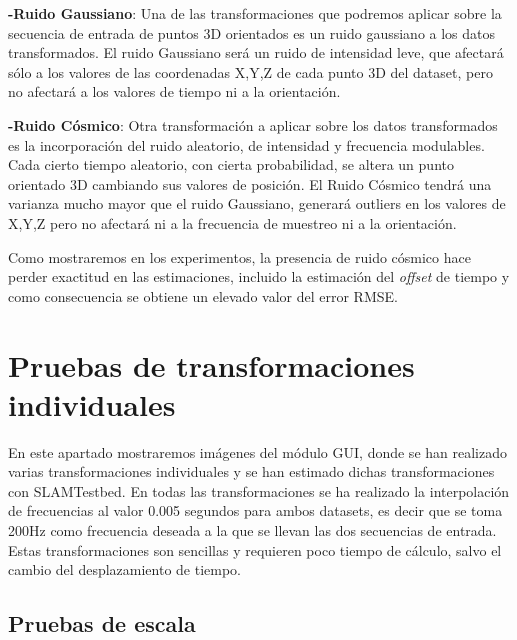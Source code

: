 \textbf{-Ruido Gaussiano}: Una de las transformaciones que podremos aplicar sobre la secuencia de entrada de puntos 3D orientados es un ruido gaussiano a los datos transformados. El ruido Gaussiano será un ruido de intensidad leve, que afectará sólo a los valores de las coordenadas X,Y,Z de cada punto 3D del dataset, pero no afectará a los valores de tiempo ni a la orientación.

\textbf{-Ruido Cósmico}: Otra transformación a aplicar sobre los datos transformados es la incorporación del ruido aleatorio, de intensidad y frecuencia modulables. Cada cierto tiempo aleatorio, con cierta probabilidad, se altera un punto orientado 3D cambiando sus valores de posición. El Ruido Cósmico tendrá una varianza mucho mayor que el ruido Gaussiano, generará outliers en los valores de X,Y,Z pero no afectará ni a la frecuencia de muestreo ni a la orientación. 

Como mostraremos en los experimentos, la presencia de ruido cósmico hace perder exactitud en las estimaciones, incluido la estimación del \textit{offset} de tiempo y como consecuencia se obtiene un elevado valor del error RMSE.


\section{Pruebas de transformaciones individuales}

En este apartado mostraremos imágenes del módulo GUI, donde se han realizado varias transformaciones individuales y se han estimado dichas transformaciones con SLAMTestbed.
En todas las transformaciones se ha realizado la interpolación de frecuencias al valor 0.005 segundos para ambos datasets, es decir que se toma 200Hz como frecuencia deseada a la que se llevan las dos secuencias de entrada. Estas transformaciones son sencillas y requieren poco tiempo de cálculo, salvo el cambio del desplazamiento de tiempo.

\subsection{Pruebas de escala}

